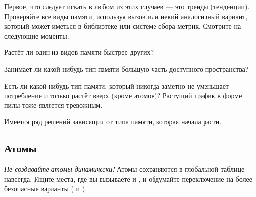 \documentclass[11pt, oneside]{book}   	%
\begin{document}
Первое, что следует искать в любом из этих случаев --- это тренды (тенденции). Проверяйте все виды памяти, используя вызов  или некий аналогичный вариант, который может иметься в библиотеке или системе сбора метрик. Смотрите на следующие моменты:

\begin{itemize*}
	\item Растёт ли один из видов памяти быстрее других?
	\item Занимает ли какой-нибудь тип памяти большую часть доступного пространства?
	\item Есть ли какой-нибудь тип памяти, который никогда заметно не уменьшает потребление и только растёт вверх (кроме атомов)? Растущий график в форме пилы тоже является тревожным.
\end{itemize*}

Имеется ряд решений зависящих от типа памяти, которая начала расти.

\subsection{Атомы}

\emph{Не создавайте атомы динамически!} Атомы сохраняются в глобальной таблице навсегда. Ищите места, где вы вызываете  и , и обдумайте переключение на более безопасные варианты ( и ). 
\end{document}

